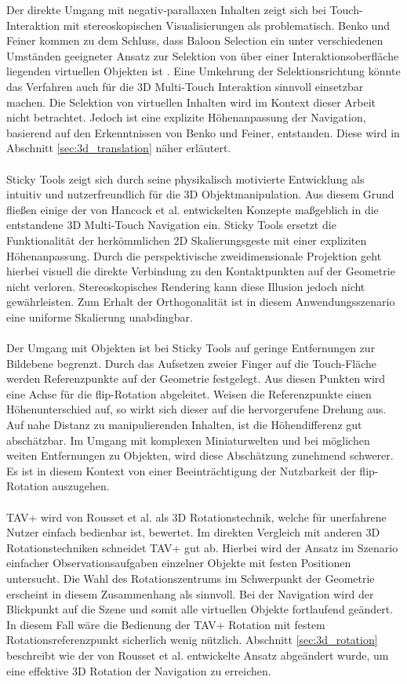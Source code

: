 Der direkte Umgang mit negativ-parallaxen Inhalten zeigt sich bei Touch-Interaktion mit stereoskopischen Visualisierungen als problematisch. Benko und Feiner kommen zu dem Schluss, dass Baloon Selection ein unter verschiedenen Umständen geeigneter Ansatz zur Selektion von über einer Interaktionsoberfläche liegenden virtuellen Objekten ist \cite{benko:2007}. Eine Umkehrung der Selektionsrichtung könnte das Verfahren auch für die 3D Multi-Touch Interaktion sinnvoll einsetzbar machen. Die Selektion von virtuellen Inhalten wird im Kontext dieser Arbeit nicht betrachtet. Jedoch ist eine explizite Höhenanpassung der Navigation, basierend auf den Erkenntnissen von Benko und Feiner, entstanden. Diese wird in Abschnitt \ref{sec:3d_translation} näher erläutert.
\\\\
Sticky Tools zeigt sich durch seine physikalisch motivierte Entwicklung als intuitiv und nutzerfreundlich für die 3D Objektmanipulation. Aus diesem Grund fließen einige der von Hancock et al. entwickelten Konzepte maßgeblich in die entstandene 3D Multi-Touch Navigation ein. Sticky Tools ersetzt die Funktionalität der herkömmlichen 2D Skalierungsgeste mit einer expliziten Höhenanpassung. Durch die perspektivische zweidimensionale Projektion geht hierbei visuell die direkte Verbindung zu den Kontaktpunkten auf der Geometrie nicht verloren. Stereoskopisches Rendering kann diese Illusion jedoch nicht gewährleisten. Zum Erhalt der Orthogonalität ist in diesem Anwendungsszenario eine uniforme Skalierung unabdingbar. 
\\\\
Der Umgang mit Objekten ist bei Sticky Tools auf geringe Entfernungen zur Bildebene begrenzt. Durch das Aufsetzen zweier Finger auf die Touch-Fläche werden Referenzpunkte auf der Geometrie festgelegt. Aus diesen Punkten wird eine Achse für die flip-Rotation abgeleitet. Weisen die Referenzpunkte einen Höhenunterschied auf, so wirkt sich dieser auf die hervorgerufene Drehung aus. Auf nahe Distanz zu manipulierenden Inhalten, ist die Höhendifferenz gut abschätzbar. Im Umgang mit komplexen Miniaturwelten und bei möglichen weiten Entfernungen zu Objekten, wird diese Abschätzung zunehmend schwerer. Es ist in diesem Kontext von einer Beeinträchtigung der Nutzbarkeit der flip-Rotation auszugehen.
\\\\
TAV+ wird von Rousset et al. als 3D Rotationstechnik, welche für unerfahrene Nutzer einfach bedienbar ist, bewertet. Im direkten Vergleich mit anderen 3D Rotationstechniken schneidet TAV+ gut ab. Hierbei wird der Ansatz im Szenario einfacher Observationsaufgaben einzelner Objekte mit festen Positionen untersucht. Die Wahl des Rotationszentrums im Schwerpunkt der Geometrie erscheint in diesem Zusammenhang als sinnvoll. Bei der Navigation wird der Blickpunkt auf die Szene und somit alle virtuellen Objekte fortlaufend geändert. In diesem Fall wäre die Bedienung der TAV+ Rotation mit festem Rotationsreferenzpunkt sicherlich wenig nützlich. Abschnitt \ref{sec:3d_rotation} beschreibt wie der von Rousset et al. entwickelte Ansatz abgeändert wurde, um eine effektive 3D Rotation der Navigation zu erreichen.
